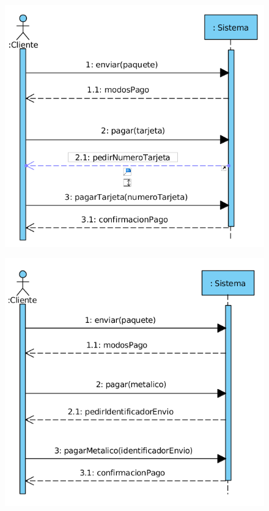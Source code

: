 \begin{figure}[H]
	\centering
	\includegraphics[width=16cm]{43}
\end{figure}
\begin{figure}[H]
	\centering
	\includegraphics[width=16cm]{44}
\end{figure}
